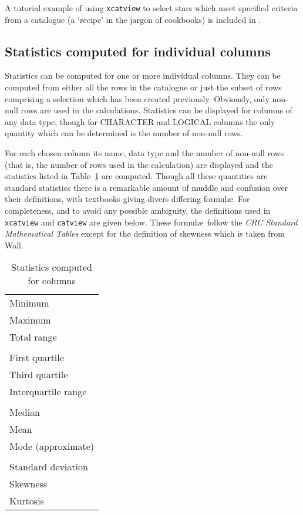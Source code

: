 \documentclass[twoside,11pt]{starlink}
\begin{document}
A tutorial example of using \texttt{xcatview} to select stars which meet
specified criteria from a catalogue (a `recipe' in the jargon of
cookbooks) is included in \cite{SC6}.


\subsection{\label{STATS}Statistics computed for individual columns}

Statistics can be computed for one or more individual columns.  They can
be computed from either all the rows in the catalogue or just the subset
of rows comprising a selection which has been created previously.  Obviously,
only non-null rows are used in the calculations.  Statistics can be
displayed for columns of any data type, though for CHARACTER and LOGICAL
columns the only quantity which can be determined is the number of
non-null rows.

For each chosen column its name, data type and the number of non-null rows
(that is, the number of rows used in the calculation) are displayed and the
statistics listed in Table~\ref{STATT} are computed.  Though all these
quantities are standard statistics there is a remarkable amount of muddle
and confusion over their definitions, with textbooks giving divers
differing formul\ae.  For completeness, and to avoid any possible
ambiguity, the definitions used in \texttt{xcatview} and \texttt{catview} are
given below.  These formul\ae\ follow the \textit{CRC Standard Mathematical
Tables}\/\cite{CRCMT} except for the definition of skewness which is taken
from Wall\cite{WALL79}.

\begin{table}[htbp]

\begin{center}
\begin{tabular}{l}
Minimum             \\
Maximum             \\
Total range         \\
  \\
First quartile      \\
Third quartile      \\
Interquartile range \\
  \\
Median              \\
Mean                \\
Mode (approximate)  \\
  \\
Standard deviation  \\
Skewness            \\
Kurtosis            \\
\end{tabular}
\end{center}

\caption{Statistics computed for columns
\label{STATT} }

\end{table}
\end{document}
